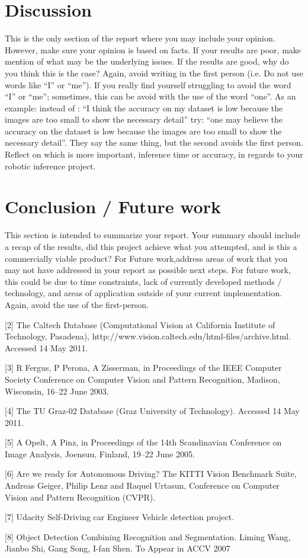 \documentclass[10pt,journal,compsoc]{IEEEtran}
\begin{document}
\section{Discussion}
This is the only section of the report where you may include your opinion. However, make sure your opinion is based on facts. If your results are poor, make mention of what may be the underlying issues. If the results are good, why do you think this is the case? Again, avoid writing in the first person (i.e. Do not use words like “I” or “me”). If you really find yourself struggling to avoid the word “I” or “me”; sometimes, this can be avoid with the use of the word “one”. As an example: instead of : “I think the accuracy on my dataset is low because the images are too small to show the necessary detail” try: “one may believe the accuracy on the dataset is low because the images are too small to show the necessary detail”. They say the same thing, but the second avoids the first person. 
Reflect on which is more important, inference time or accuracy, in regards to your robotic inference project.

\section{Conclusion / Future work}
This section is intended to summarize your report. Your summary should include a recap of the results, did this project achieve what you attempted, and is this a commercially viable product? 
For Future work,address areas of work that you may not have addressed in your report as possible next steps. For future work, this could be due to time constraints, lack of currently developed methods / technology, and areas of application outside of your current implementation. Again, avoid the use of the first-person.



[2] The Caltech Database (Computational Vision at California Institute of Technology, Pasadena), http://www.vision.caltech.edu/html-files/archive.html. Accessed 14 May 2011.

[3] R Fergus, P Perona, A Zisserman, in Proceedings of the IEEE Computer Society Conference on Computer Vision and Pattern Recognition, Madison, Wisconsin, 16–22 June 2003.

[4] The TU Graz-02 Database (Graz University of Technology). Accessed 14 May 2011. 

[5] A Opelt, A Pinz, in Proceedings of the 14th Scandinavian Conference on Image Analysis, Joensuu, Finland, 19–22 June 2005.

[6] Are we ready for Autonomous Driving? The KITTI Vision Benchmark Suite, Andreas Geiger, Philip Lenz and Raquel Urtasun, Conference on Computer Vision and Pattern	Recognition (CVPR).

[7] Udacity Self-Driving car Engineer Vehicle detection project.

[8] Object Detection Combining Recognition and Segmentation. Liming Wang, Jianbo Shi, Gang Song, I-fan Shen. To Appear in ACCV 2007
\end{document}
